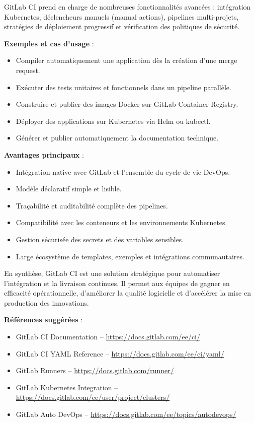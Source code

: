 GitLab CI prend en charge de nombreuses fonctionnalités avancées  : intégration Kubernetes, déclencheurs manuels (manual actions), pipelines multi-projets, stratégies de déploiement progressif et vérification des politiques de sécurité.

\textbf{Exemples et cas d’usage} :
\begin{itemize}
	\item Compiler automatiquement une application dès la création d’une merge request.
	\item Exécuter des tests unitaires et fonctionnels dans un pipeline parallèle.
	\item Construire et publier des images Docker sur GitLab Container Registry.
	\item Déployer des applications sur Kubernetes via Helm ou kubectl.
	\item Générer et publier automatiquement la documentation technique.
\end{itemize}

\textbf{Avantages principaux} :
\begin{itemize}
	\item Intégration native avec GitLab et l’ensemble du cycle de vie DevOps.
	\item Modèle déclaratif simple et lisible.
	\item Traçabilité et auditabilité complète des pipelines.
	\item Compatibilité avec les conteneurs et les environnements Kubernetes.
	\item Gestion sécurisée des secrets et des variables sensibles.
	\item Large écosystème de templates, exemples et intégrations communautaires.
\end{itemize}

En synthèse, GitLab CI est une solution stratégique pour automatiser l’intégration et la livraison continues. Il permet aux équipes de gagner en efficacité opérationnelle, d’améliorer la qualité logicielle et d’accélérer la mise en production des innovations.

\textbf{Références suggérées} :
\begin{itemize}
	\item GitLab CI Documentation – \url{https://docs.gitlab.com/ee/ci/}
	\item GitLab CI YAML Reference – \url{https://docs.gitlab.com/ee/ci/yaml/}
	\item GitLab Runners – \url{https://docs.gitlab.com/runner/}
	\item GitLab Kubernetes Integration – \url{https://docs.gitlab.com/ee/user/project/clusters/}
	\item GitLab Auto DevOps – \url{https://docs.gitlab.com/ee/topics/autodevops/}
\end{itemize}

